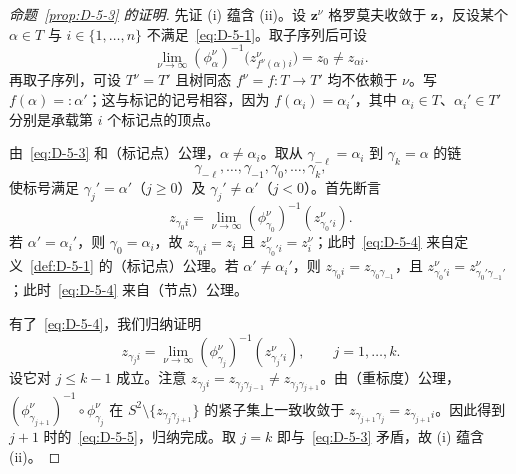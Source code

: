 \begin{proof}[命题~\ref{prop:D-5-3} 的证明]
先证 (i) 蕴含 (ii)。设 $\mathbf z^\nu$ 格罗莫夫收敛于 $\mathbf z$，反设某个 $\alpha\in T$ 与 $i\in\{1,\ldots,n\}$ 不满足~\eqref{eq:D-5-1}。取子序列后可设
\begin{equation}\label{eq:D-5-3}
  \lim_{\nu\to\infty}(\phi_\alpha^\nu)^{-1}
  \bigl(z_{f^\nu(\alpha)i}^\nu\bigr)=z_0\ne z_{\alpha i}.
\end{equation}
再取子序列，可设 $T^\nu=T'$ 且树同态 $f^\nu=f:T\to T'$ 均不依赖于 $\nu$。写 $f(\alpha)=:\alpha'$；这与标记的记号相容，因为 $f(\alpha_i)=\alpha_i'$，其中 $\alpha_i\in T$、$\alpha_i'\in T'$ 分别是承载第 $i$ 个标记点的顶点。

由~\eqref{eq:D-5-3} 和（标记点）公理，$\alpha\ne\alpha_i$。取从 $\gamma_{-\ell}=\alpha_i$ 到 $\gamma_k=\alpha$ 的链
\[
  \gamma_{-\ell},\ldots,\gamma_{-1},\gamma_0,\ldots,\gamma_k,
\]
使标号满足 $\gamma_j'=\alpha'$（$j\ge0$）及 $\gamma_j'\ne\alpha'$（$j<0$）。首先断言
\begin{equation}\label{eq:D-5-4}
  z_{\gamma_0i}=\lim_{\nu\to\infty}(\phi_{\gamma_0}^\nu)^{-1}
  (z_{\gamma_0'i}^\nu).
\end{equation}
若 $\alpha'=\alpha_i'$，则 $\gamma_0=\alpha_i$，故 $z_{\gamma_0i}=z_i$ 且 $z_{\gamma_0'i}^\nu=z_i^\nu$；此时~\eqref{eq:D-5-4} 来自定义~\ref{def:D-5-1} 的（标记点）公理。若 $\alpha'\ne\alpha_i'$，则 $z_{\gamma_0i}=z_{\gamma_0\gamma_{-1}}$，且 $z_{\gamma_0'i}^\nu=z_{\gamma_0'\gamma_{-1}'}^\nu$；此时~\eqref{eq:D-5-4} 来自（节点）公理。

有了~\eqref{eq:D-5-4}，我们归纳证明
\begin{equation}\label{eq:D-5-5}
  z_{\gamma_ji}=\lim_{\nu\to\infty}(\phi_{\gamma_j}^\nu)^{-1}
  (z_{\gamma_j'i}^\nu),\qquad j=1,\ldots,k.
\end{equation}
设它对 $j\le k-1$ 成立。注意 $z_{\gamma_ji}=z_{\gamma_j\gamma_{j-1}}\ne z_{\gamma_j\gamma_{j+1}}$。由（重标度）公理，$(\phi_{\gamma_{j+1}}^\nu)^{-1}\circ\phi_{\gamma_j}^\nu$ 在 $S^2\setminus\{z_{\gamma_j\gamma_{j+1}}\}$ 的紧子集上一致收敛于 $z_{\gamma_{j+1}\gamma_j}=z_{\gamma_{j+1}i}$。因此得到 $j+1$ 时的~\eqref{eq:D-5-5}，归纳完成。取 $j=k$ 即与~\eqref{eq:D-5-3} 矛盾，故 (i) 蕴含 (ii)。


\end{proof}
